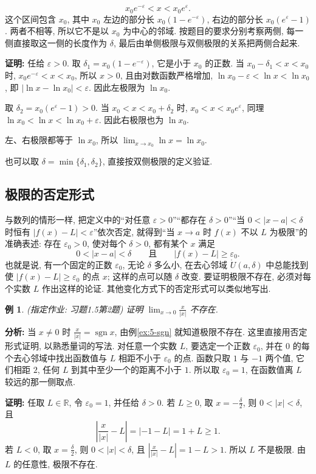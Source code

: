 \documentclass[UTF8,openany]{ctexbook}
\theoremstyle{chinesetextbook}
\newtheorem{example}{例}[section]
\newenvironment{cnproof}{\par\indent\textbf{证明:} \ignorespaces}{\par}
\begin{document}
\[
x_0e^{-\varepsilon}<x<x_0e^{\varepsilon}.
\]
这个区间包含 $x_0$, 其中 $x_0$ 左边的部分长 $x_0(1-e^{-\varepsilon})$, 右边的部分长 $x_0(e^\varepsilon-1)$. 两者不相等, 所以它不是以 $x_0$ 为中心的邻域. 按题目的要求分别考察两侧, 每一侧直接取这一侧的长度作为 $\delta$, 最后由单侧极限与双侧极限的关系把两侧合起来.
\begin{cnproof}
任给 $\varepsilon>0$. 取 $\delta_1=x_0(1-e^{-\varepsilon})$, 它是小于 $x_0$ 的正数. 当 $x_0-\delta_1<x<x_0$ 时, $x_0e^{-\varepsilon}<x<x_0$, 所以 $x>0$, 且由对数函数严格增加, $\ln x_0-\varepsilon<\ln x<\ln x_0$, 即 $|\ln x-\ln x_0|<\varepsilon$. 因此左极限为 $\ln x_0$.

取 $\delta_2=x_0(e^{\varepsilon}-1)>0$. 当 $x_0<x<x_0+\delta_2$ 时, $x_0<x<x_0e^{\varepsilon}$, 同理 $\ln x_0<\ln x<\ln x_0+\varepsilon$. 因此右极限也为 $\ln x_0$.

左、右极限都等于 $\ln x_0$, 所以 $\displaystyle\lim_{x\to x_0}\ln x=\ln x_0$.
\end{cnproof}
也可以取 $\delta=\min\{\delta_1,\delta_2\}$, 直接按双侧极限的定义验证.
\subsection{极限的否定形式}
与数列的情形一样, 把定义中的“对任意 $\varepsilon>0$”“都存在 $\delta>0$”“当 $0<|x-a|<\delta$ 时恒有 $|f(x)-L|<\varepsilon$”依次否定, 就得到“当 $x\to a$ 时 $f(x)$ 不以 $L$ 为极限”的准确表述: 存在 $\varepsilon_0>0$, 使对每个 $\delta>0$, 都有某个 $x$ 满足
\[
0<|x-a|<\delta\qquad\text{且}\qquad|f(x)-L|\ge\varepsilon_0.
\]
也就是说, 有一个固定的正数 $\varepsilon_0$, 无论 $\delta$ 多么小, 在去心邻域 $\mathring U(a,\delta)$ 中总能找到使 $|f(x)-L|\ge\varepsilon_0$ 的点 $x$; 这样的点可以随 $\delta$ 改变. 要证明极限不存在, 必须对每个实数 $L$ 作出这样的论证. 其他变化方式下的否定形式可以类似地写出.
\begin{example}
\textnormal{(指定作业: 习题1.5第2题)} 证明 $\displaystyle\lim_{x\to0}\frac x{|x|}$ 不存在.
\end{example}
\par\indent\textbf{分析:} 当 $x\ne0$ 时 $\displaystyle\frac x{|x|}=\operatorname{sgn}x$, 由例\ref{ex:5-sgn} 就知道极限不存在. 这里直接用否定形式证明, 以熟悉量词的写法. 对任意一个实数 $L$, 要选定一个正数 $\varepsilon_0$, 并在 $0$ 的每个去心邻域中找出函数值与 $L$ 相距不小于 $\varepsilon_0$ 的点. 函数只取 $1$ 与 $-1$ 两个值, 它们相距 $2$, 任何 $L$ 到其中至少一个的距离不小于 $1$. 所以取 $\varepsilon_0=1$, 在函数值离 $L$ 较远的那一侧取点.
\begin{cnproof}
任取 $L\in\mathbb R$, 令 $\varepsilon_0=1$, 并任给 $\delta>0$. 若 $L\ge0$, 取 $\displaystyle x=-\frac\delta2$, 则 $0<|x|<\delta$, 且
\[
\left|\frac x{|x|}-L\right|=|-1-L|=1+L\ge1.
\]
若 $L<0$, 取 $\displaystyle x=\frac\delta2$, 则 $0<|x|<\delta$, 且 $\displaystyle\left|\frac x{|x|}-L\right|=1-L>1$. 所以 $L$ 不是极限. 由 $L$ 的任意性, 极限不存在.
\end{cnproof}
\end{document}
